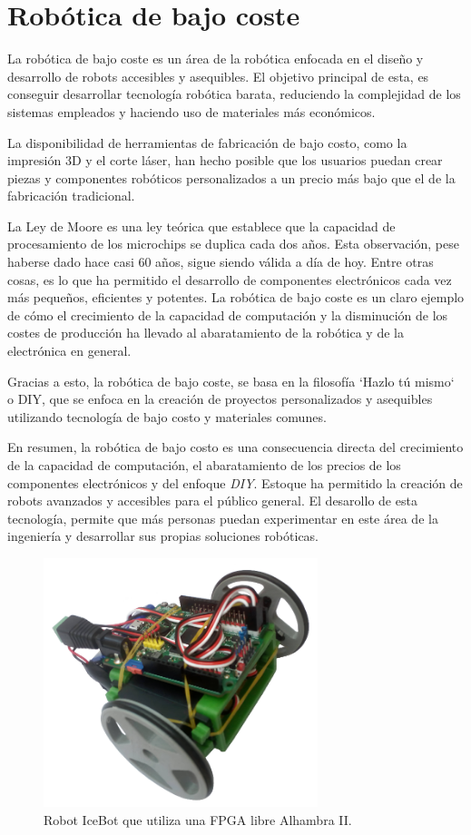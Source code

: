 \section{Robótica de bajo coste}
\label{sec:segundaseccion}
La robótica de bajo coste es un área de la robótica enfocada en el diseño y desarrollo de robots 
accesibles y asequibles. El objetivo principal de esta, es conseguir desarrollar tecnología robótica
barata, reduciendo la complejidad de los sistemas empleados y haciendo uso de materiales más económicos.

La disponibilidad de herramientas de fabricación de bajo costo, como la impresión 3D y el corte láser, 
han hecho posible que los usuarios puedan crear piezas y componentes robóticos personalizados a un 
precio más bajo que el de la fabricación tradicional.

La Ley de Moore es una ley teórica que establece que la capacidad de procesamiento de los microchips se duplica 
cada dos años. Esta observación, pese haberse dado hace casi 60 años, sigue siendo válida a día de hoy. Entre 
otras cosas, es lo que ha permitido el desarrollo de componentes electrónicos cada vez más pequeños, eficientes 
y potentes. La robótica de bajo coste es un claro ejemplo de cómo el crecimiento de la capacidad de computación y 
la disminución de los costes de producción ha llevado al abaratamiento de la robótica y de la electrónica en general.

Gracias a esto, la robótica de bajo coste, se basa en la filosofía `Hazlo tú mismo` o \ac{DIY}, que se enfoca en la creación de proyectos personalizados y 
asequibles utilizando tecnología de bajo costo y materiales comunes.

En resumen, la robótica de bajo costo es una consecuencia directa del crecimiento de la capacidad de computación, 
el abaratamiento de los precios de los componentes electrónicos y del enfoque \textit{DIY}. Estoque ha permitido la creación 
de robots avanzados y accesibles para el público general.
El desarollo de esta tecnología, permite que más personas puedan experimentar en este área de la ingeniería y desarrollar 
sus propias soluciones robóticas. 

\begin{figure} [h!]
  \begin{center}
    \includegraphics[width=8cm]{figs/icebot.png}
  \end{center}
  \caption{Robot IceBot que utiliza una FPGA libre Alhambra II.}
  \label{fig:robSecundaria}
\end{figure}\
\newpage

